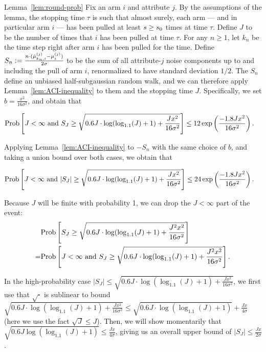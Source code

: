 \begin{extraproof}{Lemma~\ref{lem:round-prob}}
Fix an arm $i$ and attribute $j$.
By the assumptions of the lemma,
the stopping time $\tau$ is such that almost surely, each arm --- and
in particular arm $i$ --- has been pulled at least
$s \geq s_0$ times at time $\tau$.
Define $J$ to be the number of times that $i$ has been pulled at
time $\tau$.
For any $n \geq 1$, let $k_n$ be the time step right after arm $i$ has
been pulled for the  time. Define
$S_n := \frac{n \cdot (\hat{\mu}_{k_n,i}^{(j)} - \mu_{i}^{(j)})}{2 \sigma}$
to be the sum of all attribute-$j$ noise components up to and
including the  pull of arm $i$, renormalized to have standard deviation $1/2$.
The $S_n$ define an unbiased half-subgaussian random walk,
and we can therefore apply Lemma~\ref{lem:ACI-inequality} to them and
the stopping time $J$.
Specifically, we set $b = \frac{x^2}{16 \sigma^2}$,
and obtain that

\begin{align*}
\Prob{J < \infty \mbox{ and } S_J \geq 
\sqrt{0.6 J \cdot \log (\log_{1.1}(J) + 1) + \frac{J x^2}{16 \sigma^2}}}
& \leq 12 \exp \left( \frac{-1.8 J x^2}{16 \sigma^2} \right).
\end{align*}

Applying Lemma~\ref{lem:ACI-inequality} to $-S_n$ with the same choice
of $b$, and taking a union bound over both cases, we obtain that

\begin{align*}
\Prob{J < \infty \mbox{ and } |S_J| \geq 
\sqrt{0.6 J \cdot \log (\log_{1.1}(J) + 1) + \frac{J x^2}{16 \sigma^2}}}
& \leq 24 \exp \left( \frac{-1.8 J x^2}{16 \sigma^2} \right).
\end{align*}

Because $J$ will be finite with probability 1, we can drop the
$J < \infty$ part of the event:
\begin{align*}
& \Prob{S_J \geq 
\sqrt{0.6 J \cdot \log (\log_{1.1}(J) + 1) + \frac{J^2 x^2}{16
    \sigma^2}}}\\
= & \Prob{J < \infty \mbox{ and } S_J \geq 
\sqrt{0.6 J \cdot \log (\log_{1.1}(J) + 1) + \frac{J^2 x^2}{16
    \sigma^2}}}.
\end{align*}

In the high-probability case
$|S_J| \leq
\sqrt{0.6 J \cdot \log (\log_{1.1}(J) + 1) + \frac{J x^2}{16 \sigma^2}}$,
we first use that $\sqrt{\cdot}$ is sublinear to bound
$\sqrt{0.6 J \cdot \log (\log_{1.1}(J) + 1) + \frac{J x^2}{16 \sigma^2}}
\leq \sqrt{0.6 J \cdot \log (\log_{1.1}(J) + 1)} + \frac{J x}{4 \sigma}$
(here we use the fact $\sqrt{J} \leq J$).
Then, we will show momentarily that
$\sqrt{0.6 J \log (\log_{1.1}(J) + 1)} \leq \frac{J x}{4 \sigma}$,
giving us an overall upper bound of
$|S_J| \leq \frac{J x}{2 \sigma}$.


\end{extraproof}
